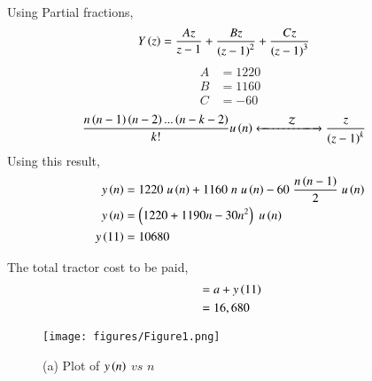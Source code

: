 \documentclass[journal,12pt,onecolumn]{IEEEtran}
\theoremstyle{remark}
\begin{document}
	Using Partial fractions,
	\begin{align}
		Y\brak z &= \dfrac{A z}{z-1} + \dfrac{B z}{\brak{z-1}^2} + \dfrac{C z}{\brak{z-1}^3}
	\end{align}
	\begin{align}
		A &= 1220\\
		B &= 1160\\
		C &= -60
	\end{align}
	\begin{align}
		\dfrac{n\brak{n-1}\brak{n-2}...\brak{n-k-2}}{k!} u\brak n &
		\xleftarrow[]{\hspace{0.8cm}{\mathcal{Z}}\hspace{0.4cm}}\xrightarrow[]{}
		\dfrac{z}{\brak{z - 1}^k}
	\end{align}
	Using this result,
	\begin{align}
		y\brak n &= 1220 \hspace{0.1cm} u\brak n + 1160 \hspace{0.1cm} n \hspace{0.1cm} u\brak n - 60 \hspace{0.1cm} \dfrac{n\brak{n-1}}{2}\hspace{0.1cm} u\brak n \\
		y\brak n &= \brak{1220 + 1190n - 30n^2} \hspace{0.1cm} u\brak n \\
		y\brak {11} &= 10680
	\end{align}
	
	The total tractor cost to be paid,
	\begin{align}
		&= a + y\brak {11}\\
		&= 16,680
	\end{align}
	
	
	\begin{figure}[htbp]
		\centering
		\texttt{[image: figures/Figure1.png]}
		\caption*{(a) Plot of $y\brak n$ $vs$ $n$}
		
	\end{figure}
	
\end{document}
